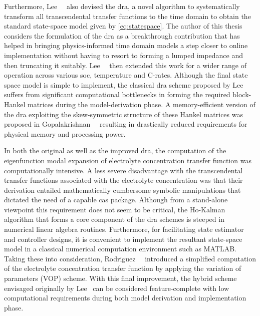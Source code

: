 Furthermore,  Lee~\etal{}~\cite{Lee2012a} also  devised the  \gls{dra}, a  novel
algorithm  to systematically  transform  all  transcendental transfer  functions
to  the  time domain   to  obtain  the  standard  state-space   model  given  by
\cref{eq:statespace}. The  author of  this thesis  considers the  formulation of
the  \gls{dra}  as a  breakthrough  contribution  that  has helped  in  bringing
physics-informed  time domain  models a  step  closer  to online  implementation
without   having  to   resort   to   forming  a   lumped   impedance  and   then
truncating  it  suitably.  Lee~\etal{}~\cite{Lee2014} then  extended  this  work
for  a  wider range  of  operation  across  various \gls{soc},  temperature  and
C-rates.  Although the  final  state space  model is  simple  to implement,  the
classical  \gls{dra} scheme  proposed  by Lee~\etal{}  suffers from  significant
computational bottlenecks  in forming the required  block-Hankel matrices during
the  model-derivation  phase.  A   memory-efficient  version  of  the  \gls{dra}
exploiting the  skew-symmetric structure of  these Hankel matrices  was proposed
in  Gopalakrishnan~\etal{}~\cite{Gopalakrishnan2017}  resulting  in  drastically
reduced requirements for physical memory and processing power.


In both the original  as well as the improved \gls{dra},  the computation of the
eigenfunction modal expansion of electrolyte concentration transfer function was
computationally intensive.  A less  severe disadvantage with  the transcendental
transfer  functions  associated  with  the electrolyte  concentration  was  that
their  derivation  entailed  mathematically  cumbersome  symbolic  manipulations
that  dictated  the   need  of  a  capable  \gls{cas}   package.  Although  from
a  stand-alone  viewpoint  this  requirement  does  not  seem  to  be  critical,
the  Ho-Kalman  algorithm   that  forms  a  core  component   of  the  \gls{dra}
schemes  is  steeped in  numerical  linear  algebra routines.  Furthermore,  for
facilitating  state  estimator  and  controller designs,  it  is  convenient  to
implement the resultant  state-space model in a  classical numerical computation
environment   such  as   \textsc{MATLAB}.  Taking   these  into   consideration,
Rodriguez~\etal{}~\cite{Rodriguez2017}  introduced a  simplified computation  of
the electrolyte  concentration transfer  function by  applying the  variation of
parameters  (VOP)  scheme.  With  this  final  improvement,  the  hybrid  scheme
envisaged originally by Lee~\etal{} can  be considered feature-complete with low
computational  requirements  during  both model  derivation  and  implementation
phase.


